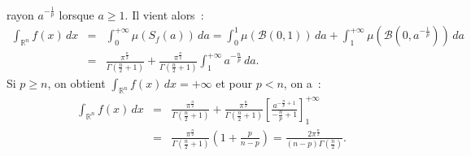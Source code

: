 {\begin{enumerate}
{rayon $a^{-\frac{1}{p}}$ lorsque $a\geq 1$. Il vient alors~:
\begin{eqnarray*}
\int_{\mathbb{R}^{n}} f(x)\,dx &=& \int_{0}^{+\infty}
\mu\left(S_{f}(a)\right)\,da = \int_{0}^{1}
\mu\left(\mathcal{B}(0,1) \right)\,da + \int_{1}^{+\infty}
\mu\left(\mathcal{B}(0, a^{-\frac{1}{p}})\right)\,da\\
& = & \frac{\pi^{\frac{n}{2}}}{\Gamma\left(\frac{n}{2}+1\right)} +
\frac{\pi^{\frac{n}{2}}}{\Gamma\left(\frac{n}{2}+1\right)}\int_{1}^{+\infty}
a^{-\frac{n}{p}}\,da.
\end{eqnarray*}
Si $p\geq n$, on obtient $\int_{\mathbb{R}^{n}} f(x)\,dx =+\infty$
et pour $p<n$, on a~:
\begin{eqnarray*}
\int_{\mathbb{R}^{n}} f(x)\,dx & =
&\frac{\pi^{\frac{n}{2}}}{\Gamma\left(\frac{n}{2}+1\right)} +
\frac{\pi^{\frac{n}{2}}}{\Gamma\left(\frac{n}{2}+1\right)}\left[\frac{a^{-\frac{n}{p}+1}}{-\frac{n}{p}+1}\right]_{1}^{+\infty}\\
&=&\frac{\pi^{\frac{n}{2}}}{\Gamma\left(\frac{n}{2}+1\right)}\left(1
+ \frac{p}{n-p} \right) = \frac{2\pi^{\frac{n}{2}}}{(n -
p)\Gamma\left(\frac{n}{2}\right)}.
\end{eqnarray*}}
\end{enumerate}
}
